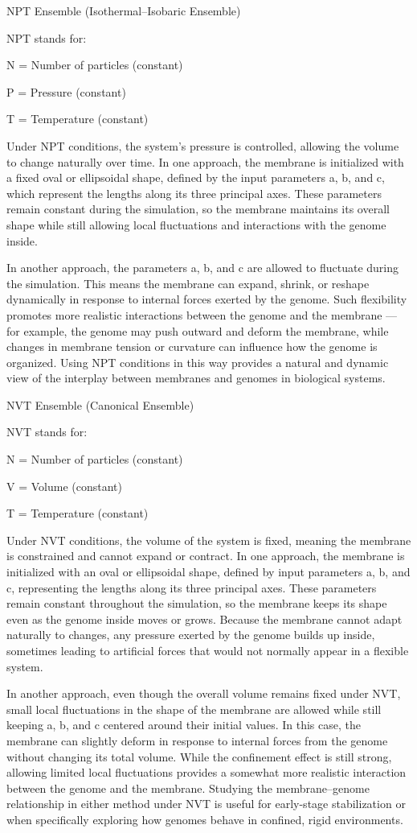\documentclass[12pt]{article}
\begin{document}
\begin{flushleft}
\noindent NPT Ensemble (Isothermal–Isobaric Ensemble)

NPT stands for:

    N = Number of particles (constant)

    P = Pressure (constant)

    T = Temperature (constant)
    
    Under NPT conditions, the system’s pressure is controlled, allowing the volume to change naturally over time. In one approach, the membrane is initialized with a fixed oval or ellipsoidal shape, defined by the input parameters a, b, and c, which represent the lengths along its three principal axes. These parameters remain constant during the simulation, so the membrane maintains its overall shape while still allowing local fluctuations and interactions with the genome inside.

In another approach, the parameters a, b, and c are allowed to fluctuate during the simulation. This means the membrane can expand, shrink, or reshape dynamically in response to internal forces exerted by the genome. Such flexibility promotes more realistic interactions between the genome and the membrane — for example, the genome may push outward and deform the membrane, while changes in membrane tension or curvature can influence how the genome is organized. Using NPT conditions in this way provides a natural and dynamic view of the interplay between membranes and genomes in biological systems.

\noindent NVT Ensemble (Canonical Ensemble)

NVT stands for:

    N = Number of particles (constant)

    V = Volume (constant)

    T = Temperature (constant)

Under NVT conditions, the volume of the system is fixed, meaning the membrane is constrained and cannot expand or contract. In one approach, the membrane is initialized with an oval or ellipsoidal shape, defined by input parameters a, b, and c, representing the lengths along its three principal axes. These parameters remain constant throughout the simulation, so the membrane keeps its shape even as the genome inside moves or grows. Because the membrane cannot adapt naturally to changes, any pressure exerted by the genome builds up inside, sometimes leading to artificial forces that would not normally appear in a flexible system.

In another approach, even though the overall volume remains fixed under NVT, small local fluctuations in the shape of the membrane are allowed while still keeping a, b, and c centered around their initial values. In this case, the membrane can slightly deform in response to internal forces from the genome without changing its total volume. While the confinement effect is still strong, allowing limited local fluctuations provides a somewhat more realistic interaction between the genome and the membrane. Studying the membrane–genome relationship in either method under NVT is useful for early-stage stabilization or when specifically exploring how genomes behave in confined, rigid environments.


\end{flushleft}
\end{document}
